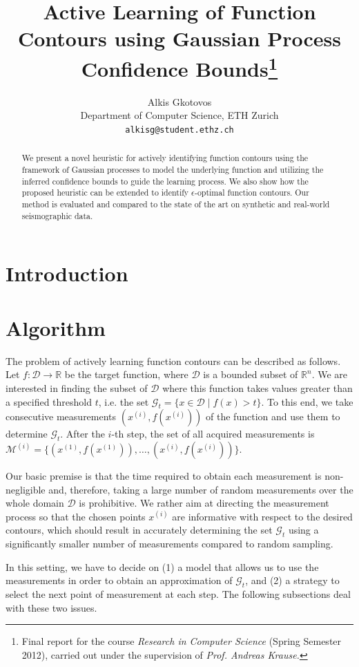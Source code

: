 \documentclass[11pt]{article} %
\title{Active Learning of Function Contours using Gaussian Process Confidence Bounds\thanks{Final
report for the course \emph{Research in Computer Science} (Spring
Semester 2012), carried out under the supervision of \emph{Prof. Andreas Krause.}}}
\author{
Alkis Gkotovos\\
Department of Computer Science, ETH Zurich\\
\texttt{alkisg@student.ethz.ch}
}
\begin{document}
\maketitle

\begin{abstract}
We present a novel heuristic for actively identifying function
contours using the framework of Gaussian processes to model the underlying
function and utilizing the
inferred confidence bounds to guide the learning process. We also show how
the proposed heuristic can be extended to identify $\epsilon$-optimal function
contours. Our method is evaluated and compared to the state of the art on
synthetic and real-world seismographic data.
\end{abstract}

\section{Introduction}


\section{Algorithm}
The problem of actively learning function contours can be described as follows.
Let ${f : \mathcal{D} \to \mathbb{R}}$ be the target function, where
$\mathcal{D}$ is a bounded subset of $\mathbb{R}^n$. We are interested in
finding the subset of $\mathcal{D}$ where this function takes values greater
than a specified threshold $t$, i.e. the set
$\mathcal{G}_t = \{x \in \mathcal{D} \mid f(x) > t\}$. To this end, we take
consecutive measurements $(x^{(i)}, f(x^{(i)}))$ of the function
and use them to determine $\mathcal{G}_t$. After the $i$-th step, the set of
all acquired measurements is
$\mathcal{M}^{(i)} = \{(x^{(1)}, f(x^{(1)})),\ldots,(x^{(i)}, f(x^{(i)}))\}$.

Our basic premise is that the time required to obtain each measurement is
non-negligible and, therefore, taking a large number of random measurements
over the whole domain $\mathcal{D}$ is prohibitive. We rather aim at directing
the measurement process so that the chosen points $x^{(i)}$ are informative with
respect to the desired contours, which should result in accurately determining
the set $\mathcal{G}_t$ using a significantly smaller number of measurements
compared to random sampling.

In this setting, we have to decide on (1) a model that allows us to use the
measurements in order to obtain an approximation of $\mathcal{G}_t$, and (2) a
strategy to select the next point of measurement at each step. The following
subsections deal with these two issues.
\end{document}
